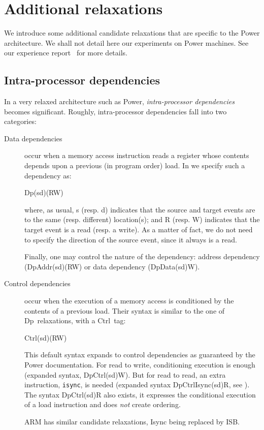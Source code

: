 \section{Additional relaxations}
We introduce some additional candidate relaxations
that are specific to the Power architecture.
We shall not detail here our experiments on Power machines.
See our experience report~
for more details.

\subsection{Intra-processor dependencies}
In a very relaxed architecture such as Power,
\emph{intra-processor dependencies} becomes significant.
Roughly, intra-processor dependencies fall into two categories:
\begin{description}
\item[Data dependencies] occur when a memory access instruction
reads a register whose contents depends upon a previous (in program order)
load. In \diy{} we specify such a dependency as:
\begin{center}Dp(s\vbar{}d)(R\vbar{}W)\end{center}
where, as usual,
s (resp. d) indicates that the source and target events
are to the same (resp. different) location(s);
and  R (resp. W) indicates that the target event is a read (resp. a write).
As a matter of fact, we do not need to specify the direction of
the source event, since it always is a read.

Finally, one may control the nature of the dependency:
address dependency (DpAddr(s\vbar{}d)(R\vbar{}W) or
data dependency (DpData(s\vbar{}d)W).


\item[Control dependencies] occur when the execution of a memory access
is conditioned by the contents of a previous load.
Their syntax is similar to the one of Dp~relaxations, with a Ctrl~tag:
\begin{center}Ctrl(s\vbar{}d)(R\vbar{}W)\end{center}
This default syntax expands to control dependencies as
guaranteed by the Power documentation.
For read to write, conditioning execution is enough
(expanded syntax, DpCtrl(s\vbar{}d)W).
But for read to read, an extra instruction, \texttt{isync}, is needed
(expanded syntax  DpCtrlIsync(s\vbar{}d)R, see ).
The syntax DpCtrl(s\vbar{}d)R also exists,
it expresses the conditional execution of a load instruction and
does \emph{not} create ordering.

ARM has similar candidate relaxations, Isync being replaced by ISB.
\end{description}
